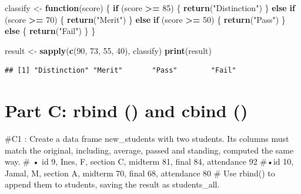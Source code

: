 \documentclass[
]{article}
\newenvironment{Shaded}{\begin{snugshade}}{\end{snugshade}}
\newcommand{\ControlFlowTok}[1]{\textcolor[rgb]{0.13,0.29,0.53}{\textbf{#1}}}
\newcommand{\DecValTok}[1]{\textcolor[rgb]{0.00,0.00,0.81}{#1}}
\newcommand{\FunctionTok}[1]{\textcolor[rgb]{0.13,0.29,0.53}{\textbf{#1}}}
\newcommand{\NormalTok}[1]{#1}
\newcommand{\OtherTok}[1]{\textcolor[rgb]{0.56,0.35,0.01}{#1}}
\newcommand{\SpecialCharTok}[1]{\textcolor[rgb]{0.81,0.36,0.00}{\textbf{#1}}}
\newcommand{\StringTok}[1]{\textcolor[rgb]{0.31,0.60,0.02}{#1}}
\begin{document}
\begin{Shaded}
\begin{Highlighting}[]
\NormalTok{classify }\OtherTok{\textless{}{-}} \ControlFlowTok{function}\NormalTok{(score) \{}
  \ControlFlowTok{if}\NormalTok{ (score }\SpecialCharTok{\textgreater{}=} \DecValTok{85}\NormalTok{) \{}
    \FunctionTok{return}\NormalTok{(}\StringTok{"Distinction"}\NormalTok{)}
\NormalTok{  \} }\ControlFlowTok{else} \ControlFlowTok{if}\NormalTok{ (score }\SpecialCharTok{\textgreater{}=} \DecValTok{70}\NormalTok{) \{}
    \FunctionTok{return}\NormalTok{(}\StringTok{"Merit"}\NormalTok{)}
\NormalTok{  \} }\ControlFlowTok{else} \ControlFlowTok{if}\NormalTok{ (score }\SpecialCharTok{\textgreater{}=} \DecValTok{50}\NormalTok{) \{}
    \FunctionTok{return}\NormalTok{(}\StringTok{"Pass"}\NormalTok{)}
\NormalTok{  \} }\ControlFlowTok{else}\NormalTok{ \{}
    \FunctionTok{return}\NormalTok{(}\StringTok{"Fail"}\NormalTok{)}
\NormalTok{  \}}
\NormalTok{\}}

\NormalTok{result }\OtherTok{\textless{}{-}} \FunctionTok{sapply}\NormalTok{(}\FunctionTok{c}\NormalTok{(}\DecValTok{90}\NormalTok{, }\DecValTok{73}\NormalTok{, }\DecValTok{55}\NormalTok{, }\DecValTok{40}\NormalTok{), classify)}
\FunctionTok{print}\NormalTok{(result)}
\end{Highlighting}
\end{Shaded}

\begin{verbatim}
## [1] "Distinction" "Merit"       "Pass"        "Fail"
\end{verbatim}

\section{Part C: rbind () and cbind ()}\label{part-c-rbind-and-cbind}

\#C1 : Create a data frame new\_students with two students. Its columns
must match the original, including, average, passed and standing,
computed the same way. \# • id 9, Ines, F, section C, midterm 81, final
84, attendance 92 \#•id 10, Jamal, M, section A, midterm 70, final 68,
attendance 80 \# Use rbind() to append them to students, saving the
result as students\_all.
\end{document}

